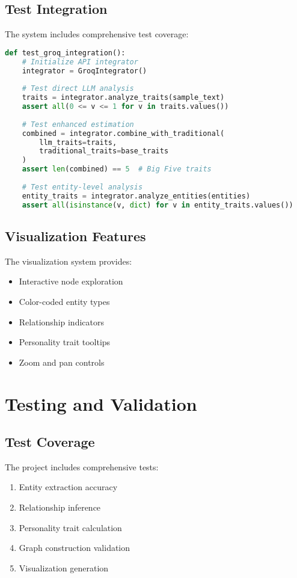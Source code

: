 \documentclass[11pt]{article}
\begin{document}
\subsection{Test Integration}
The system includes comprehensive test coverage:

\begin{lstlisting}[language=Python, caption=Test Example]
def test_groq_integration():
    # Initialize API integrator
    integrator = GroqIntegrator()
    
    # Test direct LLM analysis
    traits = integrator.analyze_traits(sample_text)
    assert all(0 <= v <= 1 for v in traits.values())
    
    # Test enhanced estimation
    combined = integrator.combine_with_traditional(
        llm_traits=traits,
        traditional_traits=base_traits
    )
    assert len(combined) == 5  # Big Five traits
    
    # Test entity-level analysis
    entity_traits = integrator.analyze_entities(entities)
    assert all(isinstance(v, dict) for v in entity_traits.values())
\end{lstlisting}

\subsection{Visualization Features}
The visualization system provides:

\begin{itemize}
    \item Interactive node exploration
    \item Color-coded entity types
    \item Relationship indicators
    \item Personality trait tooltips
    \item Zoom and pan controls
\end{itemize}

\section{Testing and Validation}

\subsection{Test Coverage}
The project includes comprehensive tests:

\begin{enumerate}
    \item Entity extraction accuracy
    \item Relationship inference
    \item Personality trait calculation
    \item Graph construction validation
    \item Visualization generation
\end{enumerate}
\end{document}
